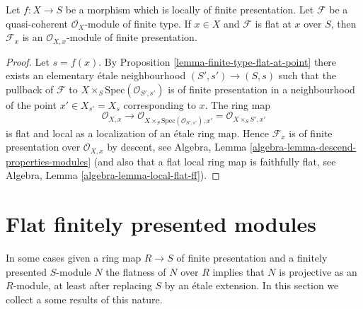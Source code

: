 \begin{lemma}
\label{lemma-finite-type-flat-at-point}
Let $f : X \to S$ be a morphism which is locally of finite presentation.
Let $\mathcal{F}$ be a quasi-coherent $\mathcal{O}_X$-module of finite type.
If $x \in X$ and $\mathcal{F}$ is flat at $x$ over $S$, then
$\mathcal{F}_x$ is an $\mathcal{O}_{X, x}$-module of finite presentation.
\end{lemma}

\begin{proof}
Let $s = f(x)$. By
Proposition \ref{lemma-finite-type-flat-at-point}
there exists an elementary \'etale neighbourhood $(S', s') \to (S, s)$
such that the pullback of $\mathcal{F}$ to
$X \times_S \text{Spec}(\mathcal{O}_{S', s'})$ is of
finite presentation in a neighbourhood of the point $x' \in X_{s'} = X_s$
corresponding to $x$. The ring map
$$
\mathcal{O}_{X, x} \longrightarrow
\mathcal{O}_{X \times_S \text{Spec}(\mathcal{O}_{S', s'}), x'}
=
\mathcal{O}_{X \times_S S', x'}
$$
is flat and local as a localization of an \'etale ring map. Hence
$\mathcal{F}_x$ is of finite presentation over $\mathcal{O}_{X, x}$
by descent, see
Algebra, Lemma \ref{algebra-lemma-descend-properties-modules}
(and also that a flat local ring map is faithfully flat, see
Algebra, Lemma \ref{algebra-lemma-local-flat-ff}).
\end{proof}



\section{Flat finitely presented modules}
\label{section-finitely-presented-flat}

\noindent
In some cases given a ring map $R \to S$ of finite presentation and
a finitely presented $S$-module $N$ the flatness of $N$ over $R$ implies
that $N$ is projective as an $R$-module, at least after replacing $S$
by an \'etale extension. In this section we collect a some results
of this nature.

